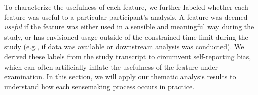 To characterize the usefulness
of each feature,
we further labeled whether each
feature was useful to a particular participant's analysis.
A feature was deemed \textit{useful}
if the feature was either used in a sensible
and meaningful way during the study,
or has envisioned usage outside of the constrained
time limit during the study
(e.g., if data was available or downstream analysis was conducted).
We derived these labels from the study transcript
to circumvent self-reporting bias,
which can often artificially inflate
the usefulness of the feature under examination.
In this section, we will apply our thematic analysis results to understand how each sensemaking process occurs in practice.%
